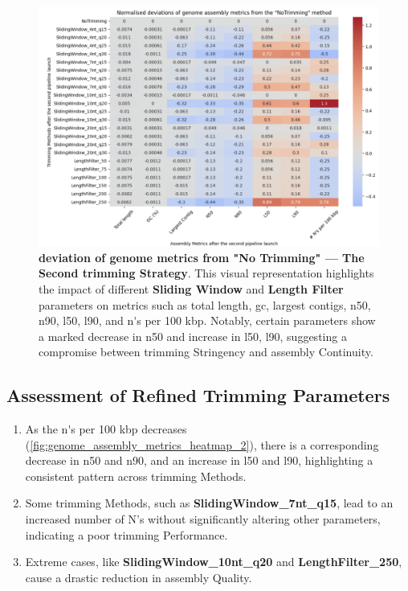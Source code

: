 \begin{figure}[H]
\centering
\includegraphics[width=\linewidth]{resources/images/genome_assembly_metrics_heatmap_2.png}
\caption{\textbf{\gls{deviation} of \gls{genome} \gls{metrics} from "No Trimming" — The Second \gls{trimming} Strategy}. This visual representation highlights the impact of different \textbf{Sliding Window} and \textbf{Length Filter} parameters on \gls{metrics} such as \gls{total length}, \gls{gc}, \gls{largest contigs}, \gls{n50}, \gls{n90}, \gls{l50}, \gls{l90}, and \gls{n's per 100 kbp}. Notably, certain parameters show a marked decrease in \gls{n50} and increase in \gls{l50}, \gls{l90}, suggesting a compromise between \gls{trimming} Stringency and \gls{assembly} Continuity.}
\label{fig:genome_assembly_metrics_heatmap_2}
\end{figure}



\subsection{Assessment of Refined Trimming Parameters}

\begin{enumerate}
  \item As the \gls{n's per 100 kbp} decreases (\autoref{fig:genome_assembly_metrics_heatmap_2}), there is a corresponding decrease in \gls{n50} and \gls{n90}, and an increase in \gls{l50} and \gls{l90}, highlighting a consistent pattern across \gls{trimming} Methods.
  \item Some \gls{trimming} Methods, such as \textbf{SlidingWindow\_7nt\_q15}, lead to an increased number of N's without significantly altering other parameters, indicating a poor \gls{trimming} Performance.
  \item Extreme cases, like \textbf{SlidingWindow\_10nt\_q20} and \textbf{LengthFilter\_250}, cause a drastic reduction in \gls{assembly} Quality.
\end{enumerate}

